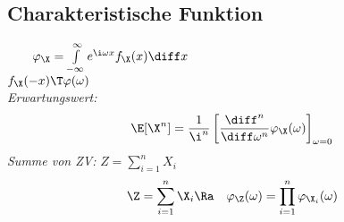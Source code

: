 \documentclass[german,color,6pt]{latex4ei/latex4ei_sheet}
\begin{document}
%	
%	
%	
%	
%	
%	

\begin{sectionbox}
	\subsection{Charakteristische Funktion} %
	\label{sub:charakteristische_funktion}
	 $\qquad \varphi_{\X} = \int\limits_{-\infty}^\infty e^{\i\omega x} f_{\X}(x) \diff x$\\
	$f_{\X}(-x) \T \varphi(\omega)$ \\
	
	\emph{Erwartungswert:}
	\begin{eqnarray*}
		\E[\X^n] = \frac{1}{\i^n} \left[\frac{\diff^n}{\diff \omega^n} \varphi_{\X}(\omega)\right]_{\omega = 0}
	\end{eqnarray*}
	\emph{Summe von ZV:} $Z=\sum_{i=1}^{n}X_i$
	\begin{eqnarray*}
		\Z = \sum_{i=1}^{n}{\X_i} & \Ra	& \varphi_{\Z} (\omega) = \prod_{i=1}^{n} \varphi_{\X_i} (\omega)
	\end{eqnarray*}
\end{sectionbox}	
\end{document}
